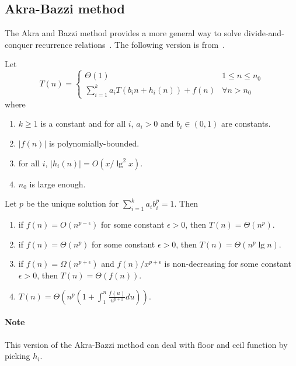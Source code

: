 \subsection{Akra\--Bazzi method}
The Akra and Bazzi method provides a more general way to solve divide-and-conquer recurrence relations~\cite{Akra1998}. The following version is from~\cite{Leighton1996}.
\begin{theorem}
Let \[T(n) = 
\begin{cases}
\Theta(1)& 1 \leq n \leq n_0 \\
\sum_{i=1}^k a_iT(b_in +h_i(n)) + f(n) &\forall n > n_0
\end{cases}\]
where
\begin{enumerate}
\item $k \geq 1$ is a constant and for all $i$, $a_i > 0$ and $b_i \in (0, 1)$ are constants.
\item $|f(n)|$ is polynomially-bounded.
\item for all $i$, $|h_i(n)| = O(x /\lg^2x)$.
\item $n_0$ is large enough.
\end{enumerate}
Let $p$ be the unique solution for $\sum_{i=1}^k a_ib_i^p = 1$. Then
\begin{enumerate}
\item if $f(n) = O(n^{p-\epsilon})$ for some constant $\epsilon > 0$, then $T(n) = \Theta(n^p)$.
\item if $f(n) = \Theta(n^{p})$ for some constant $\epsilon > 0$, then $T(n) = \Theta(n^p \lg n)$.
\item if $f(n) = \Omega(n^{p+\epsilon})$ and $f(n)/x^{p+\epsilon}$ is non-decreasing for some constant $\epsilon > 0$, then $T(n) = \Theta(f(n))$.
\item $T(n) = \Theta\left(n^p\left(1 + \int_1^n \frac{f(u)}{u^{p+1}}du\right)\right)$.
\end{enumerate}
\end{theorem}

\paragraph{Note} This version of the Akra\--Bazzi method can deal with floor and ceil function by picking $h_i$.

